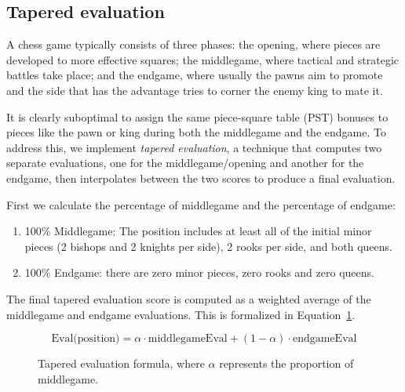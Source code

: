 \subsection*{Tapered evaluation}

\noindent A chess game typically consists of three phases: the opening, where pieces are developed to more effective squares; the middlegame, where tactical and strategic battles take place; and the endgame, where usually the pawns aim to promote and the side that has the advantage tries to corner the enemy king to mate it.

\vspace{1em}

\noindent It is clearly suboptimal to assign the same piece-square table (PST) bonuses to pieces like the pawn or king during both the middlegame and the endgame. To address this, we implement \textit{tapered evaluation}, a technique that computes two separate evaluations, one for the middlegame/opening and another for the endgame, then interpolates between the two scores to produce a final evaluation.~\cite{TaperedEvaluation}

\vspace{1em}
\noindent First we calculate the percentage of middlegame and the percentage of endgame:

\begin{enumerate}
    \item 100\% Middlegame: The position includes at least all of the initial minor pieces (2 bishops and 2 knights per side), 2 rooks per side, and both queens.
    \item 100\% Endgame: there are zero minor pieces, zero rooks and zero queens.
\end{enumerate}
\vspace{1em}

\noindent The final tapered evaluation score is computed as a weighted average of the middlegame and endgame evaluations. This is formalized in Equation~\ref{fig:taperedEvalEquation}.

\begin{figure}[H]
    \centering
    \begin{minipage}{0.8\linewidth}
        \centering
        \begin{equation*}
            \text{Eval(position)} = \alpha \cdot \text{middlegameEval} + (1 - \alpha) \cdot \text{endgameEval}
        \end{equation*}
        \vspace{-1em}
    \end{minipage}
    \caption{Tapered evaluation formula, where $\alpha$ represents the proportion of middlegame.}
    \label{fig:taperedEvalEquation}
\end{figure}

